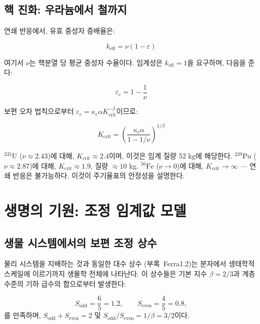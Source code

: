 \documentclass[12pt,a4paper]{article}
\newcommand{\kappac}{\kappa_c}
\newcommand{\eps}{\varepsilon}
\theoremstyle{remark}
\begin{document}
	\subsection{핵 진화: 우라늄에서 철까지}
	\label{subsec:nuclear}
	
	연쇄 반응에서, 유효 중성자 증배율은:
	
	\begin{equation}
		k_{\text{eff}} = \nu (1 - \eps)
		\label{eq:keff-nuclear}
	\end{equation}
	
	여기서 \(\nu\)는 핵분열 당 평균 중성자 수율이다. 임계성은 \(k_{\text{eff}} = 1\)을 요구하며, 다음을 준다:
	
	\begin{equation}
		\eps_c = 1 - \frac{1}{\nu}
		\label{eq:eps-c-nuclear}
	\end{equation}
	
	보편 오차 법칙으로부터 \(\eps_c = \kappac \alpha K_{\text{crit}}^{-\beta}\)이므로:
	
	\begin{equation}
		K_{\text{crit}} = \left( \frac{\kappac \alpha}{1 - 1/\nu} \right)^{1/\beta}
		\label{eq:Kcrit-nuclear}
	\end{equation}
	
	\(^{235}\text{U}\) (\(\nu \approx 2.43\))에 대해, \(K_{\text{crit}} \approx 2.4\)이며, 이것은 임계 질량 52 kg에 해당한다. \(^{239}\text{Pu}\) (\(\nu \approx 2.87\))에 대해, \(K_{\text{crit}} \approx 1.9\), 질량 \(\approx 10\) kg. \(^{56}\text{Fe}\) (\(\nu \to 0\))에 대해, \(K_{\text{crit}} \to \infty\) — 연쇄 반응은 불가능하다. 이것이 주기율표의 안정성을 설명한다.
	
	\section{생명의 기원: 조정 임계값 모델}
	\label{sec:origin-life}
	
	\subsection{생물 시스템에서의 보편 조정 상수}
	\label{subsec:bio-constants}
	
	물리 시스템을 지배하는 것과 동일한 대수 상수 (부록~Ferra1.2)는 분자에서 생태학적 스케일에 이르기까지 생물학 전체에 나타난다. 이 상수들은 기본 지수 \(\beta = 2/3\)과 계층 수준의 기하 급수의 합으로부터 발생한다:
	
	\[
	S_{\mathrm{odd}} = \frac{6}{5}=1.2,\qquad S_{\mathrm{even}} = \frac{4}{5}=0.8,
	\]
	를 만족하며, \(S_{\mathrm{odd}}+S_{\mathrm{even}}=2\) 및 \(S_{\mathrm{odd}}/S_{\mathrm{even}} = 1/\beta = 3/2\)이다.
	
\end{document}
